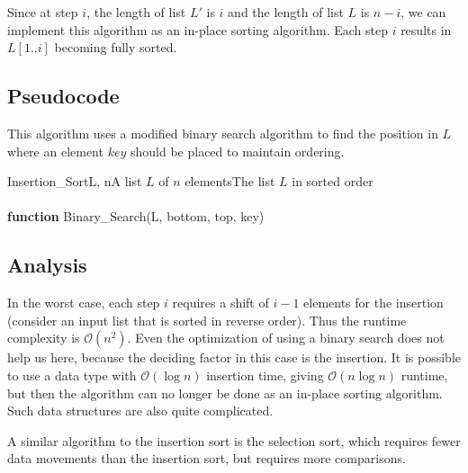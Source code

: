 \documentclass[12pt]{article}
\newcommand{\<}{\langle}
\renewcommand{\>}{\rangle}
\begin{document}
Since at step $i$, the length of list $L'$ is $i$ and the length of list $L$ is $n - i$, we can implement this
algorithm as an in-place sorting algorithm.  Each step $i$ results in $L[1..i]$ becoming fully sorted.

\subsection*{Pseudocode}

This algorithm uses a modified binary search algorithm to find the position in $L$ where an element $key$
should be placed to maintain ordering.
                                                                                                           
\begin{Lalgorithm}{Insertion\_Sort}{L, n}{A list $L$ of $n$ elements}{The list $L$ in sorted order}        
 \\
\\
\textbf{function} Binary\_Search(L, bottom, top, key) \\
\end{Lalgorithm}

\subsection*{Analysis}

In the worst case, each step $i$ requires a shift of $i - 1$ elements for the insertion (consider an input
list that is sorted in reverse order).  Thus the runtime complexity is $\mathcal{O}(n^2)$.  Even the optimization
of using a binary search does not help us here, because the deciding factor in this case is the insertion.
It is possible to use a data type with $\mathcal{O}(\log{n})$ insertion time, giving $\mathcal{O}(n\log{n})$ runtime,
but then the algorithm can no longer be done as an in-place sorting algorithm.  Such data structures are also quite
complicated.

A similar algorithm to the insertion sort is the selection sort, which requires fewer data movements than the insertion
sort, but requires more comparisons.

\end{document}
